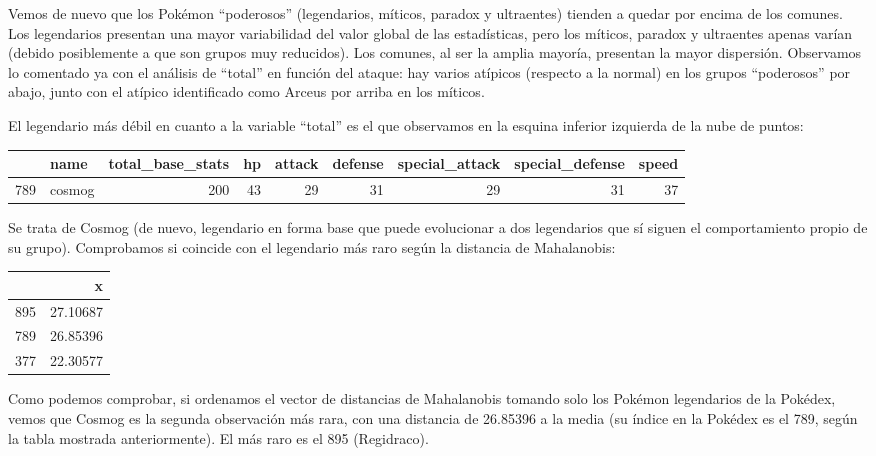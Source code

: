 \documentclass[
  12pt,
]{extreport}
\begin{document}
Vemos de nuevo que los Pokémon ``poderosos'' (legendarios, míticos,
paradox y ultraentes) tienden a quedar por encima de los comunes. Los
legendarios presentan una mayor variabilidad del valor global de las
estadísticas, pero los míticos, paradox y ultraentes apenas varían
(debido posiblemente a que son grupos muy reducidos). Los comunes, al
ser la amplia mayoría, presentan la mayor dispersión. Observamos lo
comentado ya con el análisis de ``total'' en función del ataque: hay
varios atípicos (respecto a la normal) en los grupos ``poderosos'' por
abajo, junto con el atípico identificado como Arceus por arriba en los
míticos.

El legendario más débil en cuanto a la variable ``total'' es el que
observamos en la esquina inferior izquierda de la nube de puntos:

\begin{table}[H]
\centering\begingroup\fontsize{9.5}{11.5}\selectfont

\begin{tabular}{llrrrrrrr}
\toprule
  & name & total\_base\_stats & hp & attack & defense & special\_attack & special\_defense & speed\\
\midrule
789 & cosmog & 200 & 43 & 29 & 31 & 29 & 31 & 37\\
\bottomrule
\end{tabular}
\endgroup{}
\end{table}

Se trata de Cosmog (de nuevo, legendario en forma base que puede
evolucionar a dos legendarios que sí siguen el comportamiento propio de
su grupo). Comprobamos si coincide con el legendario más raro según la
distancia de Mahalanobis:

\begin{table}[H]
\centering\begingroup\fontsize{9.5}{11.5}\selectfont

\begin{tabular}{lr}
\toprule
  & x\\
\midrule
895 & 27.10687\\
789 & 26.85396\\
377 & 22.30577\\
\bottomrule
\end{tabular}
\endgroup{}
\end{table}

Como podemos comprobar, si ordenamos el vector de distancias de
Mahalanobis tomando solo los Pokémon legendarios de la Pokédex, vemos
que Cosmog es la segunda observación más rara, con una distancia de
26.85396 a la media (su índice en la Pokédex es el 789, según la tabla
mostrada anteriormente). El más raro es el 895 (Regidraco).
\end{document}
